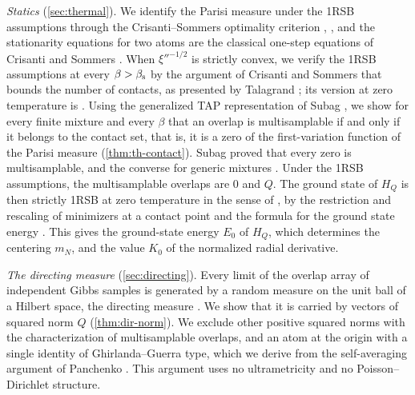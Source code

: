 \emph{Statics} (\cref{sec:thermal}). We identify the Parisi measure under the 1RSB assumptions through the Crisanti--Sommers optimality criterion \cite[Proposition~2.1]{Talagrand2006}, \cite[Lemma~1.2]{HuangSellke2024}, and the stationarity equations for two atoms are the classical one-step equations of Crisanti and Sommers \cite{CrisantiSommers1992}. When $\xi''^{-1/2}$ is strictly convex, we verify the 1RSB assumptions at every $\beta>\beta_{\mathrm s}$ by the argument of Crisanti and Sommers that bounds the number of contacts, as presented by Talagrand \cite[Proposition~2.2]{Talagrand2006}; its version at zero temperature is \cite[Lemma~3.21]{HuangSellke2024}. Using the generalized TAP representation of Subag \cite{Subag2024}, we show for every finite mixture and every $\beta$ that an overlap is multisamplable if and only if it belongs to the contact set, that is, it is a zero of the first-variation function of the Parisi measure (\cref{thm:th-contact}). Subag proved that every zero is multisamplable, and the converse for generic mixtures \cite[Theorem~10]{Subag2024}. Under the 1RSB assumptions, the multisamplable overlaps are $0$ and $Q$. The ground state of $H_Q$ is then strictly 1RSB at zero temperature in the sense of \cite[Definition~4]{HuangSellke2024}, by the restriction and rescaling of minimizers at a contact point \cite[Proposition~11]{Subag2024} and the formula for the ground state energy \cite{ChenSen2017,JagannathTobasco2017low}. This gives the ground-state energy $E_0$ of $H_Q$, which determines the centering $m_N$, and the value $K_0$ of the normalized radial derivative.

\emph{The directing measure} (\cref{sec:directing}). Every limit of the overlap array of independent Gibbs samples is generated by a random measure on the unit ball of a Hilbert space, the directing measure \cite{DovbyshSudakov1982,Panchenko2010DS}. We show that it is carried by vectors of squared norm $Q$ (\cref{thm:dir-norm}). We exclude other positive squared norms with the characterization of multisamplable overlaps, and an atom at the origin with a single identity of Ghirlanda--Guerra type, which we derive from the self-averaging argument of Panchenko \cite{Panchenko2010GG}. This argument uses no ultrametricity and no Poisson--Dirichlet structure.

